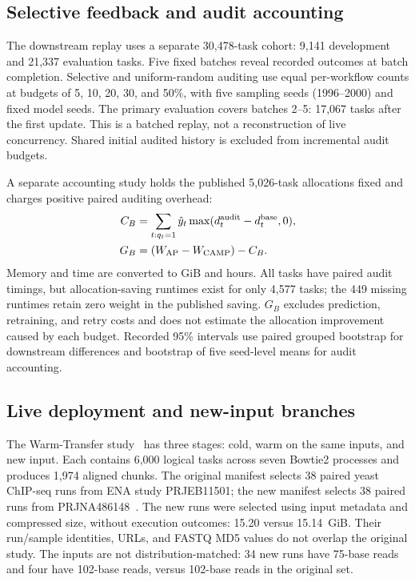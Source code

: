 \subsection{Selective feedback and audit accounting}
The downstream replay uses a separate 30,478-task cohort: 9,141 development
and 21,337 evaluation tasks. Five fixed batches reveal recorded outcomes
at batch completion. Selective and uniform-random auditing use equal
per-workflow counts at budgets of 5, 10, 20, 30, and 50\%, with five
sampling seeds (1996--2000) and fixed model seeds. The primary evaluation
covers batches 2--5: 17,067 tasks after the first update. This is a batched
replay, not a reconstruction of live concurrency. Shared initial audited
history is excluded from incremental audit budgets.

A separate accounting study holds the published 5,026-task allocations
fixed and charges positive paired auditing overhead:
\begin{equation}
\begin{aligned}
 C_B&=\sum_{t:q_t=1}\hat y_t\max(d_t^{\rm audit}-d_t^{\rm base},0),\\
 G_B&=(W_{\rm AP}-W_{\rm CAMP})-C_B.
\end{aligned}
\label{eq:audit_cost}
\end{equation}
Memory and time are converted to GiB and hours. All tasks have paired
audit timings, but allocation-saving runtimes exist for only 4,577 tasks;
the 449 missing runtimes retain zero weight in the published saving.
$G_B$ excludes prediction, retraining, and retry costs and does not estimate
the allocation improvement caused by each budget. Recorded 95\% intervals
use paired grouped bootstrap for downstream differences and bootstrap of
five seed-level means for audit accounting.


\subsection{Live deployment and new-input branches}
\label{sec:live-method}
The Warm-Transfer study~\cite{campLiveArtifact}
has three stages:
cold, warm on the same inputs, and new input. Each contains 6,000 logical
tasks across seven Bowtie2 processes and produces 1,974 aligned chunks.
The original manifest selects 38 paired yeast ChIP-seq runs from ENA study
PRJEB11501; the new manifest selects 38 paired runs from PRJNA486148~\cite{enaOriginal,enaNew}.
The new runs were selected using input metadata and compressed size,
without execution outcomes: 15.20 versus 15.14~GiB. Their run/sample
identities, URLs, and FASTQ MD5 values do not overlap the original study.
The inputs are not distribution-matched: 34 new runs have 75-base reads
and four have 102-base reads, versus 102-base reads in the original set.

